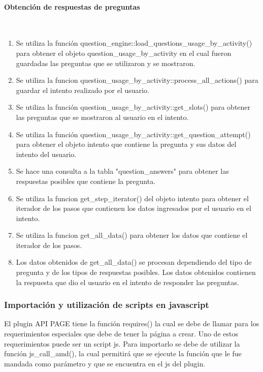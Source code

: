 		\paragraph{Obtención de respuestas de preguntas}\mbox{}\\

    \begin{enumerate}

			\item Se utiliza la función question\_engine::load\_questions\_usage\_by\_activity() para obtener el objeto question\_usage\_by\_activity en el cual fueron guardadas las preguntas que se utilizaron y se mostraron.
			\item Se utiliza la funcion question\_usage\_by\_activity::process\_all\_actions() para guardar el intento realizado por el usuario.
			\item Se utiliza la función question\_usage\_by\_activity::get\_slots() para obtener las preguntas que se mostraron al usuario en el intento.
			\item Se utiliza la función question\_usage\_by\_activity::get\_question\_attempt() para obtener el objeto intento que contiene la pregunta y sus datos del intento del usuario.
			\item Se hace una consulta a la tabla "question\_answers" para obtener las respuestas posibles que contiene la pregunta.
			\item Se utiliza la funcion get\_step\_iterator() del objeto intento para obtener el iterador de los pasos que contienen los datos ingresados por el usuario en el intento.
			\item Se utiliza la funcion get\_all\_data() para obtener los datos que contiene el iterador de los pasos.
			\item Los datos obtenidos de get\_all\_data() se procesan dependiendo del tipo de pregunta y de los tipos de respuestas posibles. Los datos obtenidos contienen la respuesta que dio el usuario en el intento de responder las preguntas.
    \end{enumerate}

    \subsubsection{Importación y utilización de scripts en javascript}

		El plugin API PAGE tiene la función requires() la cual se debe de llamar para los requerimientos especiales que debe de tener la página a crear. Uno de estos requerimientos puede ser un script js. Para importarlo se debe de utilizar la función js\_call\_amd(), la cual permitirá que se ejecute la función que le fue mandada como parámetro y que se encuentra en el js del plugin.

